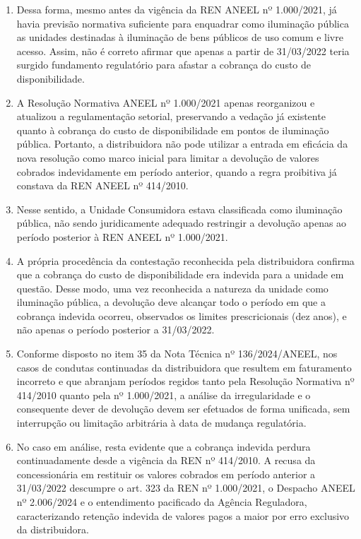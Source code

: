 \begin{enumerate}[resume]
    \item Dessa forma, mesmo antes da vigência da REN ANEEL nº 1.000/2021, já havia previsão normativa suficiente para enquadrar como iluminação pública as unidades destinadas à iluminação de bens públicos de uso comum e livre acesso. Assim, não é correto afirmar que apenas a partir de 31/03/2022 teria surgido fundamento regulatório para afastar a cobrança do custo de disponibilidade.

    \item A Resolução Normativa ANEEL nº 1.000/2021 apenas reorganizou e atualizou a regulamentação setorial, preservando a vedação já existente quanto à cobrança do custo de disponibilidade em pontos de iluminação pública. Portanto, a distribuidora não pode utilizar a entrada em eficácia da nova resolução como marco inicial para limitar a devolução de valores cobrados indevidamente em período anterior, quando a regra proibitiva já constava da REN ANEEL nº 414/2010.

    \item Nesse sentido, a Unidade Consumidora \unidadeConsumidora{} estava classificada como iluminação pública, não sendo juridicamente adequado restringir a devolução apenas ao período posterior à REN ANEEL nº 1.000/2021.

    \item A própria procedência da contestação reconhecida pela distribuidora confirma que a cobrança do custo de disponibilidade era indevida para a unidade em questão. Desse modo, uma vez reconhecida a natureza da unidade como iluminação pública, a devolução deve alcançar todo o período em que a cobrança indevida ocorreu, observados os limites prescricionais (dez anos), e não apenas o período posterior a 31/03/2022.

    \item Conforme disposto no item 35 da Nota Técnica nº 136/2024/ANEEL, nos casos de condutas continuadas da distribuidora que resultem em faturamento incorreto e que abranjam períodos regidos tanto pela Resolução Normativa nº 414/2010 quanto pela nº 1.000/2021, a análise da irregularidade e o consequente dever de devolução devem ser efetuados de forma unificada, sem interrupção ou limitação arbitrária à data de mudança regulatória.

    \item No caso em análise, resta evidente que a cobrança indevida perdura continuadamente desde a vigência da REN nº 414/2010. A recusa da concessionária em restituir os valores cobrados em período anterior a 31/03/2022 descumpre o art. 323 da REN nº 1.000/2021, o Despacho ANEEL nº 2.006/2024 e o entendimento pacificado da Agência Reguladora, caracterizando retenção indevida de valores pagos a maior por erro exclusivo da distribuidora.
\end{enumerate}


